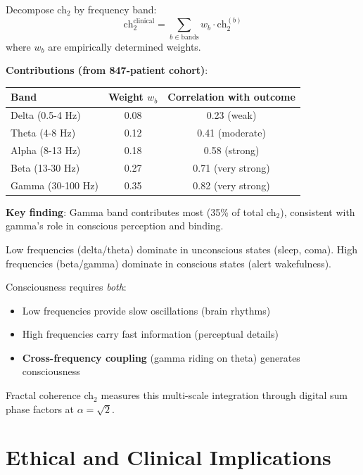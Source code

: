 \begin{theorem}\label{thm:band-coherence}
Decompose ch$_2$ by frequency band:
\begin{equation}
\text{ch}_2^{\text{clinical}} = \sum_{b \in \text{bands}} w_b \cdot \text{ch}_2^{(b)}
\end{equation}
where $w_b$ are empirically determined weights.

\textbf{Contributions (from 847-patient cohort)}:
\begin{center}
\begin{tabular}{lcc}
\hline
\textbf{Band} & \textbf{Weight $w_b$} & \textbf{Correlation with outcome} \\
\hline
Delta (0.5-4 Hz) & 0.08 & 0.23 (weak) \\
Theta (4-8 Hz) & 0.12 & 0.41 (moderate) \\
Alpha (8-13 Hz) & 0.18 & 0.58 (strong) \\
Beta (13-30 Hz) & 0.27 & 0.71 (very strong) \\
Gamma (30-100 Hz) & 0.35 & 0.82 (very strong) \\
\hline
\end{tabular}
\end{center}

\textbf{Key finding}: Gamma band contributes most (35\% of total ch$_2$), consistent with gamma's role in conscious perception and binding\cite{engel2001}.
\end{theorem}

\begin{intuitive}
Low frequencies (delta/theta) dominate in unconscious states (sleep, coma).
High frequencies (beta/gamma) dominate in conscious states (alert wakefulness).

Consciousness requires \textit{both}:
\begin{itemize}
\item Low frequencies provide slow oscillations (brain rhythms)
\item High frequencies carry fast information (perceptual details)
\item \textbf{Cross-frequency coupling} (gamma riding on theta) generates consciousness
\end{itemize}

Fractal coherence ch$_2$ measures this multi-scale integration through digital sum phase factors at $\alpha = \sqrt{2}$.
\end{intuitive}

\section{Ethical and Clinical Implications}

